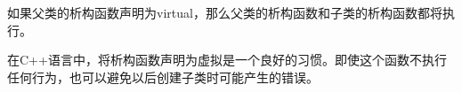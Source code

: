 如果父类的析构函数声明为virtual，那么父类的析构函数和子类的析构函数都将执行。

在C++语言中，将析构函数声明为虚拟是一个良好的习惯。即使这个函数不执行任何行为，也可以避免以后创建子类时可能产生的错误。


\begin{lstlisting}[language=C++]

\end{lstlisting}





\begin{lstlisting}[language=C++]

\end{lstlisting}


































